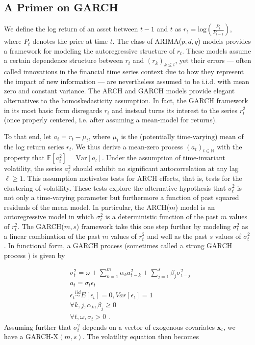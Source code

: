 \documentclass{uiucthesis2021}
\newcommand{\x}{\textbf{x}}
\newcommand{\simiid}{\stackrel{iid}{\sim}} %
\def\mrm#1{\mathrm{#1}} %
\def\E{\mathbb{E}} %
\theoremstyle{definition}
\begin{document}
  \subsection{A Primer on GARCH}
We define the log return of an asset between $t-1$ and $t$ as $r_{t} = \text{log}(\frac{P_{t}}{P_{t-1}})$, where $P_{t}$ denotes the price at time $t$.  The class of ARIMA($p,d,q$) models  \citep{box2013box} provides a framework for modeling the autoregressive structure of $r_{t}$.  These models assume a certain dependence structure between $r_{t}$ and $(r_{k})_{k\leq t}$, yet their errors --- often called innovations in the financial time series context due to how they represent the impact of new information --- are nevertheless assumed to be i.i.d. with mean zero and constant variance.  The ARCH \citep{engle1982autoregressive} and GARCH \citep{bollerslev1986generalized} models provide elegant alternatives to the homoskedasticity assumption.  In fact, the GARCH framework in its most basic form disregards $r_{t}$ and instead turns its interest to the series $r_{t}^{2}$ (once properly centered, i.e. after assuming a mean-model for returns).  

To that end, let $a_{t} = r_{t} - \mu_{t}$, where $\mu_{t}$ is the (potentially time-varying) mean of the log return series $r_{t}$.  We thus derive a mean-zero process $(a_{t})_{t\in\mathbb{N}}$ with the property that $\E[a^{2}_{t}] = \mrm{Var}[a_{t}]$.  Under the assumption of time-invariant volatility, the series $a_{t}^{2}$ should exhibit no significant autocorrelation at any lag $\ell\geq1$.  This assumption motivates tests for ARCH effects, that is, tests for the clustering of volatility.  These tests explore the alternative hypothesis that $\sigma_{t}^{2}$ is not only a time-varying parameter but furthermore a function of past squared residuals of the mean model.  In particular, the ARCH($m$) model is an autoregressive model in which $\sigma_{t}^{2}$ is a deterministic function of the past $m$ values of $r_{t}^{2}$.  The GARCH($m,s$) framework take this one step further by modeling $\sigma_{t}^{2}$ as a linear combination of the past $m$ values of $r_{t}^{2}$ and well as the past $s$ values of $\sigma_{t}^{2}$.  In functional form, a GARCH process (sometimes called a strong GARCH process \citep[p. 19]{francq2019garch}) is given by

\begin{align*}
&\sigma_{t}^{2} = \omega + \sum^{m}_{k=1}\alpha_{k}a^{2}_{t-k} + \sum_{j=1}^{s}\beta_{j}\sigma_{t-j}^{2}\\
&a_{t} = \sigma_{t}\epsilon_{t}\\
&\epsilon_{t} \simiid E[\epsilon_{t}]=0, Var[\epsilon_{t}] = 1\\
&\forall k,j, \alpha_{k},\beta_{j}\geq 0\\ 
&\forall t, \omega, \sigma_{t} > 0 \text { .} 
\end{align*}
Assuming further that $\sigma^{2}_{t}$ depends on a vector of exogenous covariates $\x_{t}$, we have a  GARCH-X$(m,s)$.  The volatility equation then becomes 
\end{document}
